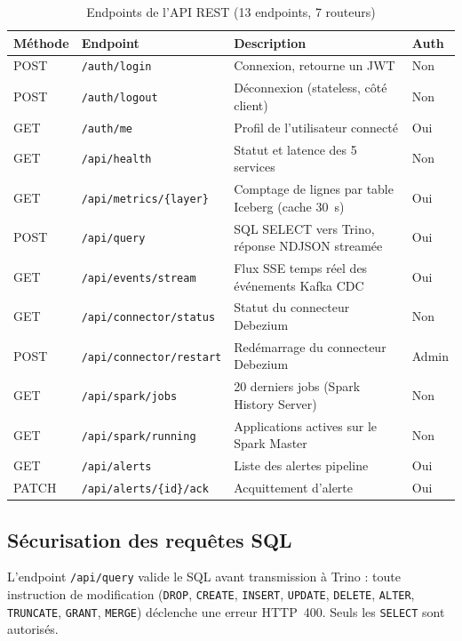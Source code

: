 \documentclass[12pt,a4paper]{report}
\begin{document}
\begin{table}[h]
\centering
\caption{Endpoints de l'API REST (13 endpoints, 7 routeurs)}
\label{tab:api}
\renewcommand{\arraystretch}{1.3}
\begin{tabularx}{\linewidth}{llXl}
\toprule
\textbf{Méthode} & \textbf{Endpoint} & \textbf{Description} & \textbf{Auth} \\
\midrule
POST  & \texttt{/auth/login}
    & Connexion, retourne un JWT & Non \\
POST  & \texttt{/auth/logout}
    & Déconnexion (stateless, côté client) & Non \\
GET   & \texttt{/auth/me}
    & Profil de l'utilisateur connecté & Oui \\
\midrule
GET   & \texttt{/api/health}
    & Statut et latence des 5 services & Non \\
GET   & \texttt{/api/metrics/\{layer\}}
    & Comptage de lignes par table Iceberg (cache 30~s) & Oui \\
POST  & \texttt{/api/query}
    & SQL SELECT vers Trino, réponse NDJSON streamée & Oui \\
GET   & \texttt{/api/events/stream}
    & Flux SSE temps réel des événements Kafka CDC & Oui \\
\midrule
GET   & \texttt{/api/connector/status}
    & Statut du connecteur Debezium & Non \\
POST  & \texttt{/api/connector/restart}
    & Redémarrage du connecteur Debezium & Admin \\
GET   & \texttt{/api/spark/jobs}
    & 20 derniers jobs (Spark History Server) & Non \\
GET   & \texttt{/api/spark/running}
    & Applications actives sur le Spark Master & Non \\
\midrule
GET   & \texttt{/api/alerts}
    & Liste des alertes pipeline & Oui \\
PATCH & \texttt{/api/alerts/\{id\}/ack}
    & Acquittement d'alerte & Oui \\
\bottomrule
\end{tabularx}
\end{table}

\subsection{Sécurisation des requêtes SQL}

L'endpoint \texttt{/api/query} valide le SQL avant transmission à Trino :
toute instruction de modification (\texttt{DROP}, \texttt{CREATE},
\texttt{INSERT}, \texttt{UPDATE}, \texttt{DELETE}, \texttt{ALTER},
\texttt{TRUNCATE}, \texttt{GRANT}, \texttt{MERGE}) déclenche une erreur
HTTP~400. Seuls les \texttt{SELECT} sont autorisés.
\end{document}
